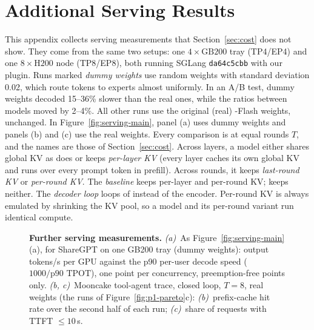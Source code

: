 \section{Additional Serving Results}
\label{app:serving-more}

This appendix collects serving measurements that Section~\ref{sec:cost} does not show. They come from the same two
setups: one $4\times\text{GB200}$ tray (TP4/EP4) and one $8\times\text{H200}$ node (TP8/EP8), both running SGLang
\texttt{da64c5cbb} with our plugin. Runs marked \emph{dummy weights} use random weights with standard deviation 0.02,
which route tokens to experts almost uniformly. In an A/B test, dummy weights decoded 15--36\% slower than the real
ones, while the ratios between models moved by 2--4\%. All other runs use the original (real) \vfour-Flash weights, unchanged. In Figure~\ref{fig:serving-main}, panel (a) uses dummy weights and
panels (b) and (c) use the real weights. Every
comparison is at equal rounds $T$, and the names are those of Section~\ref{sec:cost}. Across layers, a model either
shares global KV as \ced does or keeps \emph{per-layer KV} (every layer  caches its own global KV and runs
over every prompt token in prefill). Across rounds, it keeps \emph{last-round KV} or \emph{per-round KV}. The
\emph{baseline} keeps per-layer and per-round KV; \emph{\ourmethod} keeps neither. The \emph{decoder loop} loops
 of \ced instead of the encoder. Per-round KV is always emulated by shrinking the KV pool, so a model and its
per-round variant run identical compute.

\begin{figure}[t]
\centering
{}
\caption{\textbf{Further serving measurements.} \emph{(a)}~As Figure~\ref{fig:serving-main}(a), for ShareGPT on
one GB200 tray (dummy weights): output tokens/s per GPU against the p90 per-user decode speed
($1000/\text{p90 TPOT}$), one point per concurrency, preemption-free points only. \emph{(b, c)}~Mooncake tool-agent trace, closed loop, $T=8$, real
weights (the runs of Figure~\ref{fig:p1-pareto}c): \emph{(b)}~prefix-cache hit rate over the second half of each run;
\emph{(c)}~share of requests with TTFT $\le 10$\,s.}
\label{fig:serving-more}
\end{figure}

